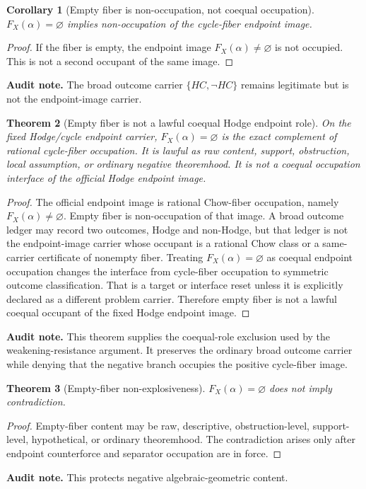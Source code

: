 \documentclass[11pt]{article}
\newtheorem{theorem}{Theorem}[section]
\newtheorem{corollary}[theorem]{Corollary}
\begin{document}
\begin{corollary}[Empty fiber is non-occupation, not coequal occupation]
$F_X(\alpha)=\varnothing$ implies non-occupation of the cycle-fiber endpoint image.
\end{corollary}
\begin{proof}
If the fiber is empty, the endpoint image $F_X(\alpha)\neq\varnothing$ is not occupied. This is not a second occupant of the same image.
\end{proof}
\par\noindent\textbf{Audit note.} The broad outcome carrier $\{HC,\neg HC\}$ remains legitimate but is not the endpoint-image carrier.

\begin{theorem}[Empty fiber is not a lawful coequal Hodge endpoint role]
On the fixed Hodge/cycle endpoint carrier, $F_X(\alpha)=\varnothing$ is the exact complement of rational cycle-fiber occupation. It is lawful as raw content, support, obstruction, local assumption, or ordinary negative theoremhood. It is not a coequal occupation interface of the official Hodge endpoint image.
\end{theorem}
\begin{proof}
The official endpoint image is rational Chow-fiber occupation, namely $F_X(\alpha)\neq\varnothing$. Empty fiber is non-occupation of that image. A broad outcome ledger may record two outcomes, Hodge and non-Hodge, but that ledger is not the endpoint-image carrier whose occupant is a rational Chow class or a same-carrier certificate of nonempty fiber. Treating $F_X(\alpha)=\varnothing$ as coequal endpoint occupation changes the interface from cycle-fiber occupation to symmetric outcome classification. That is a target or interface reset unless it is explicitly declared as a different problem carrier. Therefore empty fiber is not a lawful coequal occupant of the fixed Hodge endpoint image.
\end{proof}
\par\noindent\textbf{Audit note.} This theorem supplies the coequal-role exclusion used by the weakening-resistance argument. It preserves the ordinary broad outcome carrier while denying that the negative branch occupies the positive cycle-fiber image.


\begin{theorem}[Empty-fiber non-explosiveness]
$F_X(\alpha)=\varnothing$ does not imply contradiction.
\end{theorem}
\begin{proof}
Empty-fiber content may be raw, descriptive, obstruction-level, support-level, hypothetical, or ordinary theoremhood. The contradiction arises only after endpoint counterforce and separator occupation are in force.
\end{proof}
\par\noindent\textbf{Audit note.} This protects negative algebraic-geometric content.
\end{document}
